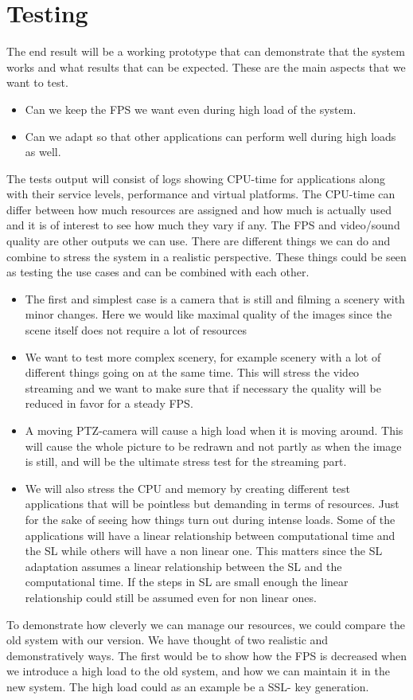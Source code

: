 \documentclass[nobiblatex]{LTHthesis}
\begin{document}
\chapter{Testing}
The end result will be a working prototype that can demonstrate that the system works and what results that can be expected. These are the main aspects that we want to test.
\begin{itemize}
\item Can we keep the FPS we want even during high load of the system.
\item Can we adapt so that other applications can perform well during high loads as well. 
\end{itemize}

The tests output will consist of logs showing CPU-time for applications along with their service levels, performance and virtual platforms. The CPU-time can differ between how much resources are assigned and how much is actually used and it is of interest to see how much they vary if any. The FPS and video/sound quality are other outputs we can use.
There are different things we can do and combine to stress the system in a realistic perspective. These things could be seen as testing the use cases and can be combined with each other. 

\begin{itemize}

\item The first and simplest case is a camera that is still and filming a scenery with minor changes. Here we would like maximal quality of the images since the scene itself does not require a lot of resources 
\item We want to test more complex scenery, for example scenery with a lot of different things going on at the same time. This will stress the video streaming and we want to make sure that if necessary the quality will be reduced in favor for a steady FPS.
\item A moving PTZ-camera will cause a high load when it is moving around. This will cause the whole picture to be redrawn and not partly as when the image is still, and will be the ultimate stress test for the streaming part.
\item We will also stress the CPU and memory by creating different test applications that will be pointless but demanding in terms of resources. Just for the sake of seeing how things turn out during intense loads. Some of the applications will have a linear relationship between computational time and the SL while others will have a non linear one. This matters since the SL adaptation assumes a linear relationship between the SL and the computational time. If the steps in SL are small enough the linear relationship could still be assumed even for non linear ones.
\end{itemize}
To demonstrate how cleverly we can manage our resources, we could compare the old system with our version. We have thought of two realistic and demonstratively ways. The first would be to show how the FPS is decreased when we introduce a high load to the old system, and how we can maintain it in the new system. The high load could as an example be a SSL- key generation.
\end{document}
